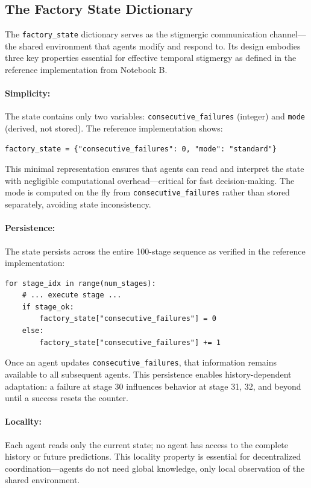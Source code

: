 \documentclass[12pt,a4paper,oneside]{report}
\begin{document}
\subsection{The Factory State Dictionary}

The \texttt{factory\_state} dictionary serves as the stigmergic communication channel—the shared environment that agents modify and respond to. Its design embodies three key properties essential for effective temporal stigmergy as defined in the reference implementation from Notebook B.

\paragraph{Simplicity:} The state contains only two variables: \texttt{consecutive\_failures} (integer) and \texttt{mode} (derived, not stored). The reference implementation shows:

\begin{verbatim}
factory_state = {"consecutive_failures": 0, "mode": "standard"}
\end{verbatim}

This minimal representation ensures that agents can read and interpret the state with negligible computational overhead—critical for fast decision-making. The mode is computed on the fly from \texttt{consecutive\_failures} rather than stored separately, avoiding state inconsistency.

\paragraph{Persistence:} The state persists across the entire 100-stage sequence as verified in the reference implementation:

\begin{verbatim}
for stage_idx in range(num_stages):
    # ... execute stage ...
    if stage_ok:
        factory_state["consecutive_failures"] = 0
    else:
        factory_state["consecutive_failures"] += 1
\end{verbatim}

Once an agent updates \texttt{consecutive\_failures}, that information remains available to all subsequent agents. This persistence enables history-dependent adaptation: a failure at stage 30 influences behavior at stage 31, 32, and beyond until a success resets the counter.

\paragraph{Locality:} Each agent reads only the current state; no agent has access to the complete history or future predictions. This locality property is essential for decentralized coordination—agents do not need global knowledge, only local observation of the shared environment.
\end{document}
